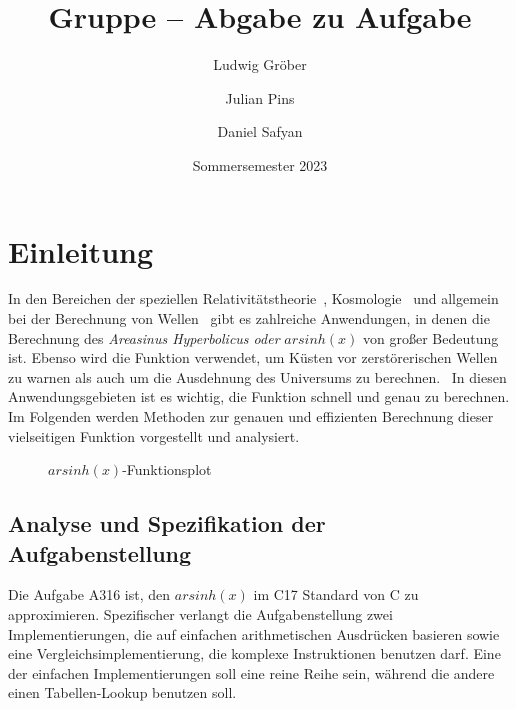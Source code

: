 \documentclass[course=erap] {aspdoc}
\author{Ludwig Gröber \and Julian Pins \and Daniel Safyan}
\date{Sommersemester 2023} %
\title{Gruppe \theGroup{} -- Abgabe zu Aufgabe \theNumber}
\begin{document}
    \maketitle


    \section{Einleitung}\label{sec:einleitung}

    In den Bereichen der speziellen Relativitätstheorie~\cite{relativity}, Kosmologie~\cite{universum1,universum2} und allgemein bei der Berechnung von Wellen~\cite{linear_waves} gibt es zahlreiche Anwendungen, in denen die Berechnung des \textit{Areasinus Hyperbolicus oder} $arsinh(x)$ von großer Bedeutung ist.
    Ebenso wird die Funktion verwendet, um Küsten vor zerstörerischen Wellen zu warnen als auch um die Ausdehnung des Universums zu berechnen.~\cite{universum1,universum2}
    In diesen Anwendungsgebieten ist es wichtig, die Funktion schnell und genau zu berechnen.
    Im Folgenden werden Methoden zur genauen und effizienten Berechnung dieser vielseitigen Funktion vorgestellt und analysiert.
    \begin{figure}[h]
        \caption{$arsinh(x)$-Funktionsplot}
    \end{figure}

    \subsection{Analyse und Spezifikation der Aufgabenstellung}\label{subsec:analyse-und-spezifikation-der-aufgabenstellung}

    Die Aufgabe A316 ist, den $arsinh(x)$ im C17 Standard von C zu approximieren.
    Spezifischer verlangt die Aufgabenstellung zwei Implementierungen, die auf einfachen arithmetischen Ausdrücken basieren sowie eine Vergleichsimplementierung, die komplexe Instruktionen benutzen darf.
    Eine der einfachen Implementierungen soll eine reine Reihe sein, während die andere einen Tabellen-Lookup benutzen soll.
\end{document}
